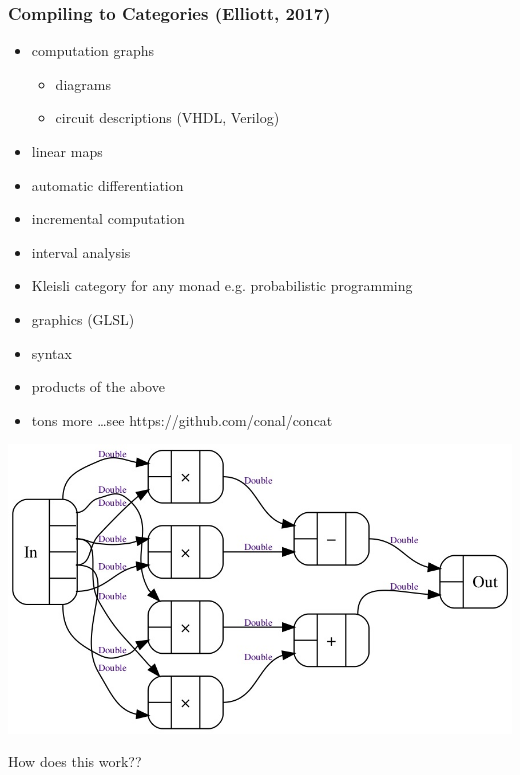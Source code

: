 \documentclass[
xcolor={usenames,dvipsnames,svgnames},
]{beamer}
\begin{document}
  \begin{frame}
    \frametitle{Compiling to Categories (Elliott, 2017)}
    \begin{itemize}
      \item computation graphs
      \begin{itemize}
        \item diagrams
        \item circuit descriptions (VHDL, Verilog)
      \end{itemize}
      \item linear maps
      \item automatic differentiation
      \item incremental computation
      \item interval analysis
      \item Kleisli category for any monad e.g. probabilistic programming
      \item graphics (GLSL)
      \item syntax
      \item products of the above
      \item tons more \ldots see https://github.com/conal/concat
    \end{itemize}
  \end{frame}

  {\usebackgroundtemplate%
  {%
  \parbox[c][\paperheight][c]{\paperwidth}{\centering\includegraphics[width=\paperwidth]{graphics/complex-mul.jpg}}
  }

  \begin{frame}
  \end{frame}

  }

  \begin{frame}
    \begin{center}
      \Large \color{black}
      How does this work??
    \end{center}
  \end{frame}
\end{document}
